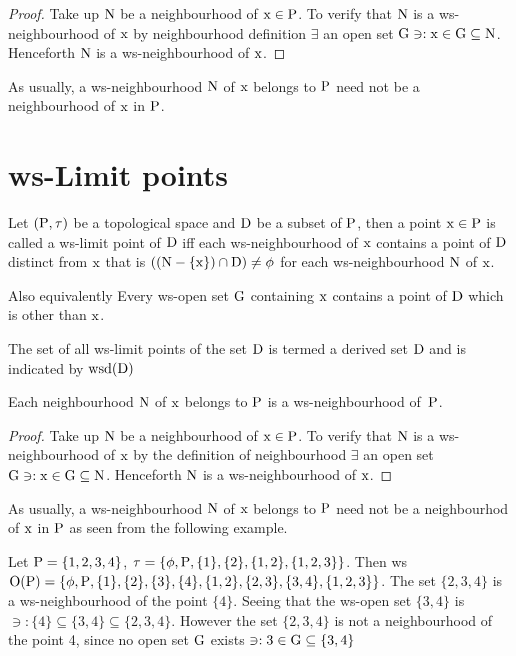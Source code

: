 \begin{proof}
Take up $\mathrm{N}$ be a neighbourhood of $\mathrm{x}\in \mathrm{P}$. To verify that $\mathrm{N}$ is a ws-neighbour\-hood of $\mathrm{x}$ by neighbourhood definition $\exists$ an open set $\mathrm{G} \ni: \mathrm{x}\in \mathrm{G}\subseteq \mathrm{N}$. Henceforth $\mathrm{N}$ is a ws-neighbourhood of $\mathrm{x}$.
\end{proof}

\begin{rem}\label{rem2.5.1} 
As usually, a ws-neighbourhood $\mathrm{N}$ of $\mathrm{x}$ belongs to $\mathrm{P}$ need not be a neighbourhood of $\mathrm{x}$ in $\mathrm{P}$.
\end{rem}

\section{ws-Limit points}\label{sec2.6}

\begin{dfn}\label{defi2.6.1}
Let $(\mathrm{P}, \tau)$ be a topological space and $\mathrm{D}$ be a subset of $\mathrm{P}$, then a point $\mathrm{x}\in \mathrm{P}$ is called a ws-limit point of $\mathrm{D}$ iff each ws-neighbourhood of $\mathrm{x}$ contains a point of $\mathrm{D}$ distinct from $\mathrm{x}$ that is $((\mathrm{N}-\{\mathrm{x}\})\cap \mathrm{D})\neq \phi$ for each ws-neighbourhood $\mathrm{N}$ of $\mathrm{x}$.
\end{dfn}

Also equivalently Every ws-open set $\mathrm{G}$ containing $\mathrm{x}$ contains a point of $\mathrm{D}$ which is other than $\mathrm{x}$.

\begin{dfn}\label{defi2.6.2}
The set of all ws-limit points of the set $\mathrm{D}$ is termed a derived set $\mathrm{D}$ and is indicated by $\mathrm{wsd}(\mathrm{D})$
\end{dfn}

\begin{thm}\label{thm2.6.1}
Each neighbourhood $\mathrm{N}$ of $\mathrm{x}$ belongs to $\mathrm{P}$ is a ws-neighbourhood of~$\mathrm{P}$.
\end{thm}

\begin{proof}
Take up $\mathrm{N}$ be a neighbourhood of $\mathrm{x}\in \mathrm{P}$. To verify that $\mathrm{N}$ is a ws-neighbour\-hood of $\mathrm{x}$ by the definition of neighbourhood $\exists$ an open set $\mathrm{G} \ni: \mathrm{x}\in\mathrm{G}\subseteq \mathrm{N}$. Henceforth $\mathrm{N}$ is a ws-neighbourhood of $\mathrm{x}$.
\end{proof}

\begin{rem}\label{rem2.6.1}
As usually, a ws-neighbourhood $\mathrm{N}$ of $\mathrm{x}$ belongs to $\mathrm{P}$ need not be a neighbourhod of $\mathrm{x}$ in $\mathrm{P}$ as seen from the following example.
\end{rem}

\begin{exm}\label{exam2.6.1}
Let $\mathrm{P} = \{1, 2, 3, 4 \}$, $\tau = \{\phi, \mathrm{P}, \{1\}, \{2\}, \{1, 2\}, \{1, 2, 3\}\}$. Then ws$\mathrm{O}(\mathrm{P})= \{\phi, \mathrm{P}, \{1\}, \{2\}, \{3\}, \{4\},\{1, 2\},\{2, 3\}, \{3, 4\}, \{1, 2, 3\}\}$. The set $\{2, 3, 4\}$ is a ws-neighbourhood of the point $\{4\}$. Seeing that the ws-open set $\{3, 4\}$ is $\ni: \{4\}\subseteq \{3, 4\} \subseteq \{2, 3, 4\}$. However the set $\{2, 3, 4\}$ is not a neighbourhood of the point 4, since no open set $\mathrm{G}$ exists $\ni: 3\in \mathrm{G}\subseteq \{3, 4\}$
\end{exm}
